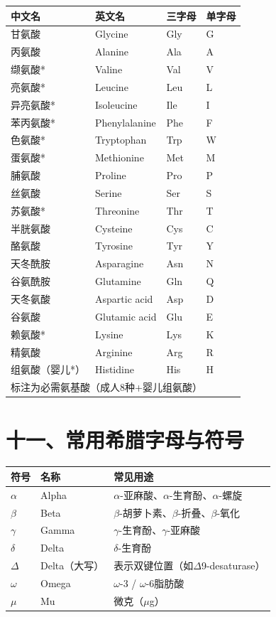 \begin{table}[H]
\centering
\begin{tabularx}{\textwidth}{llll}
\toprule
\textbf{中文名} & \textbf{英文名} & \textbf{三字母} & \textbf{单字母} \\
\midrule
甘氨酸 & Glycine & Gly & G \\
丙氨酸 & Alanine & Ala & A \\
缬氨酸* & Valine & Val & V \\
亮氨酸* & Leucine & Leu & L \\
异亮氨酸* & Isoleucine & Ile & I \\
苯丙氨酸* & Phenylalanine & Phe & F \\
色氨酸* & Tryptophan & Trp & W \\
蛋氨酸* & Methionine & Met & M \\
脯氨酸 & Proline & Pro & P \\
丝氨酸 & Serine & Ser & S \\
苏氨酸* & Threonine & Thr & T \\
半胱氨酸 & Cysteine & Cys & C \\
酪氨酸 & Tyrosine & Tyr & Y \\
天冬酰胺 & Asparagine & Asn & N \\
谷氨酰胺 & Glutamine & Gln & Q \\
天冬氨酸 & Aspartic acid & Asp & D \\
谷氨酸 & Glutamic acid & Glu & E \\
赖氨酸* & Lysine & Lys & K \\
精氨酸 & Arginine & Arg & R \\
组氨酸（婴儿*） & Histidine & His & H \\
\bottomrule
\multicolumn{4}{l}{\small * 标注为必需氨基酸（成人8种+婴儿组氨酸）} \\
\end{tabularx}
\end{table}

\section{十一、常用希腊字母与符号}

\begin{table}[H]
\centering
\begin{tabularx}{\textwidth}{llX}
\toprule
\textbf{符号} & \textbf{名称} & \textbf{常见用途} \\
\midrule
$\alpha$ & Alpha & $\alpha$-亚麻酸、$\alpha$-生育酚、$\alpha$-螺旋 \\
$\beta$ & Beta & $\beta$-胡萝卜素、$\beta$-折叠、$\beta$-氧化 \\
$\gamma$ & Gamma & $\gamma$-生育酚、$\gamma$-亚麻酸 \\
$\delta$ & Delta & $\delta$-生育酚 \\
$\Delta$ & Delta（大写） & 表示双键位置（如$\Delta$9-desaturase） \\
$\omega$ & Omega & $\omega$-3 / $\omega$-6脂肪酸 \\
$\mu$ & Mu & 微克（$\mu$g） \\
\bottomrule
\end{tabularx}
\end{table}

\newpage
